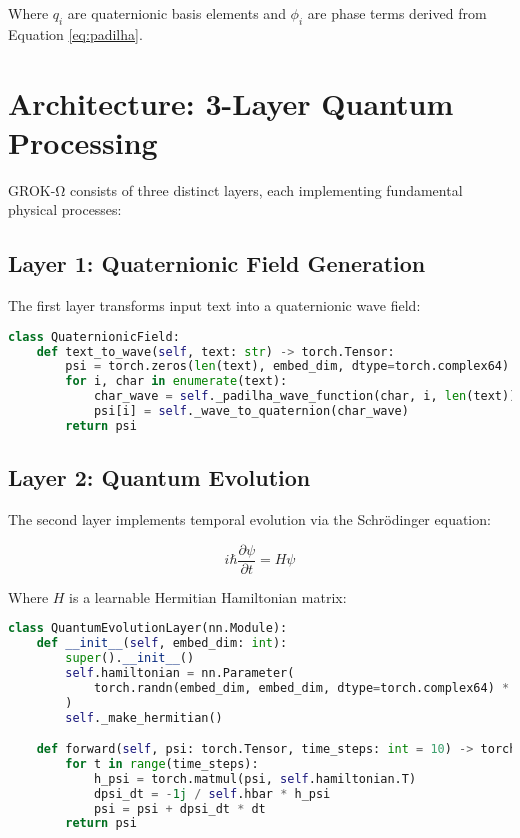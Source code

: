 \documentclass[11pt,a4paper]{article}
\begin{document}
Where $q_i$ are quaternionic basis elements and $\phi_i$ are phase terms derived from Equation \ref{eq:padilha}.

\section{Architecture: 3-Layer Quantum Processing}

GROK-Ω consists of three distinct layers, each implementing fundamental physical processes:

\subsection{Layer 1: Quaternionic Field Generation}

The first layer transforms input text into a quaternionic wave field:

\begin{lstlisting}[language=Python, caption=Quaternionic Field Generation]
class QuaternionicField:
    def text_to_wave(self, text: str) -> torch.Tensor:
        psi = torch.zeros(len(text), embed_dim, dtype=torch.complex64)
        for i, char in enumerate(text):
            char_wave = self._padilha_wave_function(char, i, len(text))
            psi[i] = self._wave_to_quaternion(char_wave)
        return psi
\end{lstlisting}

\subsection{Layer 2: Quantum Evolution}

The second layer implements temporal evolution via the Schrödinger equation:

\begin{equation}
i\hbar \frac{\partial \psi}{\partial t} = H \psi
\end{equation}

Where $H$ is a learnable Hermitian Hamiltonian matrix:

\begin{lstlisting}[language=Python, caption=Quantum Evolution Layer]
class QuantumEvolutionLayer(nn.Module):
    def __init__(self, embed_dim: int):
        super().__init__()
        self.hamiltonian = nn.Parameter(
            torch.randn(embed_dim, embed_dim, dtype=torch.complex64) * 0.1
        )
        self._make_hermitian()

    def forward(self, psi: torch.Tensor, time_steps: int = 10) -> torch.Tensor:
        for t in range(time_steps):
            h_psi = torch.matmul(psi, self.hamiltonian.T)
            dpsi_dt = -1j / self.hbar * h_psi
            psi = psi + dpsi_dt * dt
        return psi
\end{lstlisting}
\end{document}
